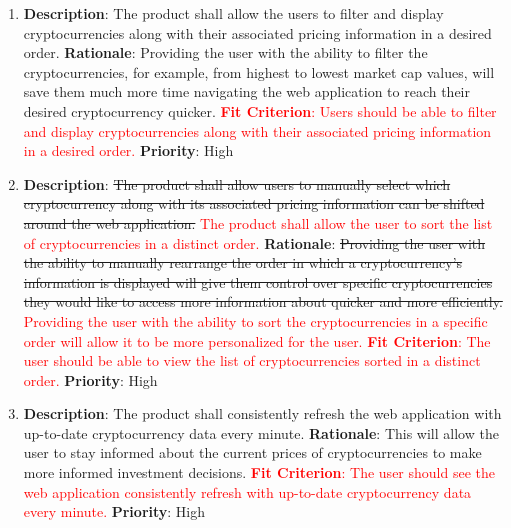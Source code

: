 \documentclass[12pt, titlepage]{article}
\begin{document}
\begin{enumerate}[label = FR-\arabic*, left=\parindent, series=fr]
    \item \textbf{Description}: The product shall allow the users to filter and display cryptocurrencies along with their associated pricing information in a desired order. 
    \newline \textbf{Rationale}: Providing the user with the ability to filter the cryptocurrencies, for example, from highest to lowest market cap values, will save them much
    more time navigating the web application to reach their desired cryptocurrency quicker. 
    \newline \textcolor{red} {\textbf{Fit Criterion}: Users should be able to filter and display cryptocurrencies along with their associated pricing information in a desired order.}
    \newline \textbf{Priority}: High

   \item \textbf{Description}: \sout{The product shall allow users to manually select which cryptocurrency along with its associated pricing information can be shifted around the web application.} \textcolor{red}{The product shall allow the user to sort the list of cryptocurrencies in a distinct order.}
    \newline \textbf{Rationale}: \sout{Providing the user with the ability to manually rearrange the order in which a cryptocurrency's information is displayed will give them control over specific cryptocurrencies they would like to access more information about quicker and more efficiently.} \textcolor{red}{Providing the user with the ability to sort the cryptocurrencies in a specific order will allow it to be more personalized for the user.}
    \newline \textcolor{red} {\textbf{Fit Criterion}: The user should be able to view the list of cryptocurrencies sorted in a distinct order.}
    \newline \textbf{Priority}: High
    

    \item \textbf{Description}: The product shall consistently refresh the web application with up-to-date cryptocurrency data every minute.
    \newline \textbf{Rationale}: This will allow the user to stay informed about the current prices of cryptocurrencies to make more informed investment decisions.
    \newline \textcolor{red} {\textbf{Fit Criterion}: The user should see the web application consistently refresh with up-to-date cryptocurrency data every minute.}
    \newline \textbf{Priority}: High
    

\end{enumerate}
\end{document}
